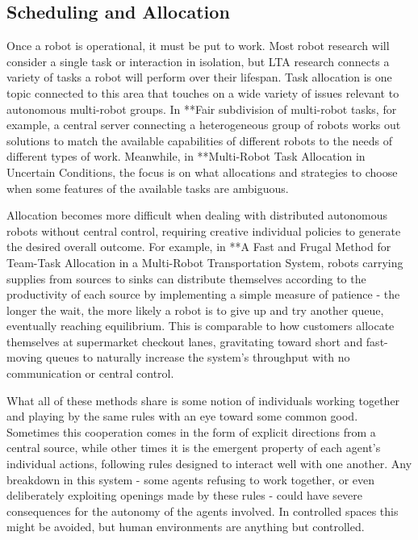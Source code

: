 \documentclass{sfuthesis}
\begin{document}

\subsection{Scheduling and Allocation}


Once a robot is operational, it must be put to work. Most robot research will consider a single task or interaction in isolation, but LTA research connects a variety of tasks a robot will perform over their lifespan. Task allocation is one topic connected to this area that touches on a wide variety of issues relevant to autonomous multi-robot groups. In **Fair subdivision of multi-robot tasks, for example, a central server connecting a heterogeneous group of robots works out solutions to match the available capabilities of different robots to the needs of different types of work. Meanwhile, in **Multi-Robot Task Allocation in Uncertain Conditions, the focus is on what allocations and strategies to choose when some features of the available tasks are ambiguous.

Allocation becomes more difficult when dealing with distributed autonomous robots without central control, requiring creative individual policies to generate the desired overall outcome. For example, in **A Fast and Frugal Method for Team-Task Allocation in a Multi-Robot Transportation System, robots carrying supplies from sources to sinks can distribute themselves according to the productivity of each source by implementing a simple measure of patience - the longer the wait, the more likely a robot is to give up and try another queue, eventually reaching equilibrium. This is comparable to how customers allocate themselves at supermarket checkout lanes, gravitating toward short and fast-moving queues to naturally increase the system's throughput with no communication or central control.

What all of these methods share is some notion of individuals working together and playing by the same rules with an eye toward some common good. Sometimes this cooperation comes in the form of explicit directions from a central source, while other times it is the emergent property of each agent's individual actions, following rules designed to interact well with one another. Any breakdown in this system - some agents refusing to work together, or even deliberately exploiting openings made by these rules - could have severe consequences for the autonomy of the agents involved. In controlled spaces this might be avoided, but human environments are anything but controlled.
\end{document}
